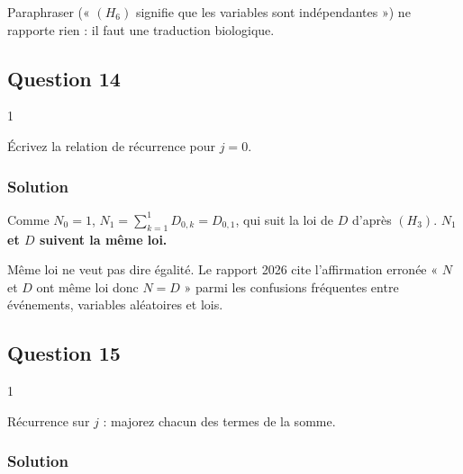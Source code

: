 \documentclass[11pt,a4paper]{article}
\begin{document}
\begin{piege}

Paraphraser (« \((H_6)\) signifie que les variables sont indépendantes ») ne rapporte rien : il faut une traduction biologique.

\end{piege}

\hypertarget{question-14}{%
\subsection{Question 14}\label{question-14}}

\begin{indication}{1}

Écrivez la relation de récurrence pour \(j=0\).

\end{indication}

\hypertarget{solution-27}{%
\subsubsection{Solution}\label{solution-27}}

Comme \(N_0=1\), \(N_1=\sum_{k=1}^1D_{0,k}=D_{0,1}\), qui suit la loi de \(D\) d'après \((H_3)\). \textbf{\(N_1\) et \(D\) suivent la même loi.}

\begin{piege}

Même loi ne veut pas dire égalité. Le rapport 2026 cite l'affirmation erronée « \(N\) et \(D\) ont même loi donc \(N=D\) » parmi les confusions fréquentes entre événements, variables aléatoires et lois.

\end{piege}

\hypertarget{question-15}{%
\subsection{Question 15}\label{question-15}}

\begin{indication}{1}

Récurrence sur \(j\) : majorez chacun des termes de la somme.

\end{indication}

\hypertarget{solution-28}{%
\subsubsection{Solution}\label{solution-28}}
\end{document}
